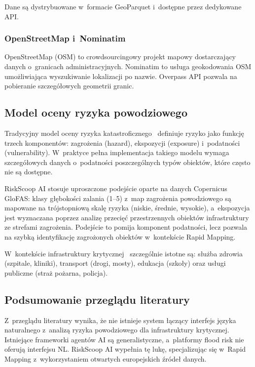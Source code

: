 Dane są dystrybuowane w~formacie GeoParquet i~dostępne przez dedykowane API.

\subsubsection{OpenStreetMap i~Nominatim}

OpenStreetMap (OSM) to crowdsourcingowy projekt mapowy dostarczający danych o~granicach administracyjnych. Nominatim to usługa geokodowania OSM umożliwiająca wyszukiwanie lokalizacji po nazwie. Overpass API pozwala na pobieranie szczegółowych geometrii granic.

\subsection{Model oceny ryzyka powodziowego}

Tradycyjny model oceny ryzyka katastroficznego~\cite{pregnolato2022bridge} definiuje ryzyko jako funkcję trzech komponentów: zagrożenia (hazard), ekspozycji (exposure) i~podatności (vulnerability). W~praktyce pełna implementacja takiego modelu wymaga szczegółowych danych o~podatności poszczególnych typów obiektów, które często nie są dostępne.

RiskScoop AI stosuje uproszczone podejście oparte na danych Copernicus GloFAS: klasy głębokości zalania (1--5) z~map zagrożenia powodziowego są mapowane na trójstopniową skalę ryzyka (niskie, średnie, wysokie), a~ekspozycja jest wyznaczana poprzez analizę przecięć przestrzennych obiektów infrastruktury ze strefami zagrożenia. Podejście to pomija komponent podatności, lecz pozwala na szybką identyfikację zagrożonych obiektów w~kontekście Rapid Mapping.

W~kontekście infrastruktury krytycznej~\cite{chukwuma2021flood} szczególnie istotne są: służba zdrowia (szpitale, kliniki), transport (drogi, mosty), edukacja (szkoły) oraz usługi publiczne (straż pożarna, policja).

\subsection{Podsumowanie przeglądu literatury}

Z~przeglądu literatury wynika, że nie istnieje system łączący interfejs języka naturalnego z~analizą ryzyka powodziowego dla infrastruktury krytycznej. Istniejące frameworki agentów AI są generalistyczne, a~platformy flood risk nie oferują interfejsu NL. RiskScoop AI wypełnia tę lukę, specjalizując się w~Rapid Mapping z~wykorzystaniem otwartych europejskich źródeł danych.

